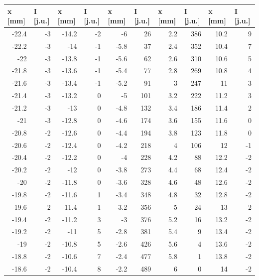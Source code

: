 \documentclass{article}
\begin{document}
\begin{table}[h!tbp]
\centering
\begin{tabular}{|r|r|r|r|r|r|r|r|r|r|}
\hline
\multicolumn{1}{|l|}{x [mm]} & \multicolumn{1}{l|}{I [j.u.]} & \multicolumn{1}{l|}{x [mm]} & \multicolumn{1}{l|}{I [j.u.]} & \multicolumn{1}{l|}{x [mm]} & \multicolumn{1}{l|}{I [j.u.]} & \multicolumn{1}{l|}{x [mm]} & \multicolumn{1}{l|}{I [j.u.]} & \multicolumn{1}{l|}{x [mm]} & \multicolumn{1}{l|}{I [j.u.]} \\ \hline
-22.4 & -3 & -14.2 & -2 & -6 & 26 & 2.2 & 386 & 10.2 & 9 \\ \hline
-22.2 & -3 & -14 & -1 & -5.8 & 37 & 2.4 & 352 & 10.4 & 7 \\ \hline
-22 & -3 & -13.8 & -1 & -5.6 & 62 & 2.6 & 310 & 10.6 & 5 \\ \hline
-21.8 & -3 & -13.6 & -1 & -5.4 & 77 & 2.8 & 269 & 10.8 & 4 \\ \hline
-21.6 & -3 & -13.4 & -1 & -5.2 & 91 & 3 & 247 & 11 & 3 \\ \hline
-21.4 & -3 & -13.2 & 0 & -5 & 101 & 3.2 & 222 & 11.2 & 3 \\ \hline
-21.2 & -3 & -13 & 0 & -4.8 & 132 & 3.4 & 186 & 11.4 & 2 \\ \hline
-21 & -3 & -12.8 & 0 & -4.6 & 174 & 3.6 & 155 & 11.6 & 0 \\ \hline
-20.8 & -2 & -12.6 & 0 & -4.4 & 194 & 3.8 & 123 & 11.8 & 0 \\ \hline
-20.6 & -2 & -12.4 & 0 & -4.2 & 218 & 4 & 106 & 12 & -1 \\ \hline
-20.4 & -2 & -12.2 & 0 & -4 & 228 & 4.2 & 88 & 12.2 & -2 \\ \hline
-20.2 & -2 & -12 & 0 & -3.8 & 273 & 4.4 & 68 & 12.4 & -2 \\ \hline
-20 & -2 & -11.8 & 0 & -3.6 & 328 & 4.6 & 48 & 12.6 & -2 \\ \hline
-19.8 & -2 & -11.6 & 1 & -3.4 & 348 & 4.8 & 32 & 12.8 & -2 \\ \hline
-19.6 & -2 & -11.4 & 1 & -3.2 & 356 & 5 & 24 & 13 & -2 \\ \hline
-19.4 & -2 & -11.2 & 3 & -3 & 376 & 5.2 & 16 & 13.2 & -2 \\ \hline
-19.2 & -2 & -11 & 5 & -2.8 & 381 & 5.4 & 9 & 13.4 & -2 \\ \hline
-19 & -2 & -10.8 & 5 & -2.6 & 426 & 5.6 & 4 & 13.6 & -2 \\ \hline
-18.8 & -2 & -10.6 & 7 & -2.4 & 477 & 5.8 & 1 & 13.8 & -2 \\ \hline
-18.6 & -2 & -10.4 & 8 & -2.2 & 489 & 6 & 0 & 14 & -2 \\ \hline

\end{tabular}
\end{table}
\end{document}
